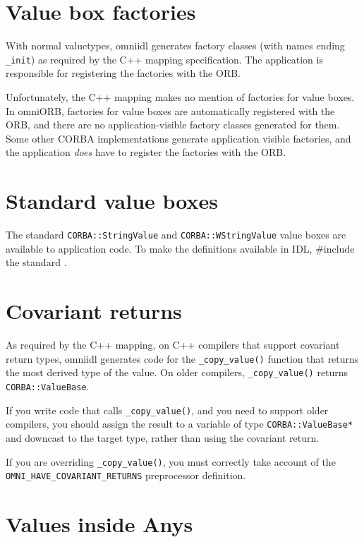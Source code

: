\documentclass[11pt,oneside,a4paper]{book}
\newcommand{\type}[1]{\texttt{#1}}
\newcommand{\code}[1]{\texttt{#1}}
\newcommand{\op}[1]{\texttt{#1()}}
\begin{document}
\section{Value box factories}

With normal valuetypes, omniidl generates factory classes (with names
ending \code{\_init}) as required by the C++ mapping specification.
The application is responsible for registering the factories with the
ORB.

Unfortunately, the C++ mapping makes no mention of factories for value
boxes. In omniORB, factories for value boxes are automatically
registered with the ORB, and there are no application-visible factory
classes generated for them. Some other CORBA implementations generate
application visible factories, and the application \emph{does} have to
register the factories with the ORB.


\section{Standard value boxes}

The standard \type{CORBA::StringValue} and \type{CORBA::WStringValue}
value boxes are available to application code. To make the definitions
available in IDL, \#include the standard .


\section{Covariant returns}

As required by the C++ mapping, on C++ compilers that support
covariant return types, omniidl generates code for the
\op{\_copy\_value} function that returns the most derived type of the
value. On older compilers, \op{\_copy\_value} returns
\type{CORBA::ValueBase}.

If you write code that calls \op{\_copy\_value}, and you need to
support older compilers, you should assign the result to a variable of
type \type{CORBA::ValueBase*} and downcast to the target type, rather
than using the covariant return.

If you are overriding \op{\_copy\_value}, you must correctly take
account of the \code{OMNI\_HAVE\_COVARIANT\_RETURNS} preprocessor
definition.



\section{Values inside Anys}
\end{document}
